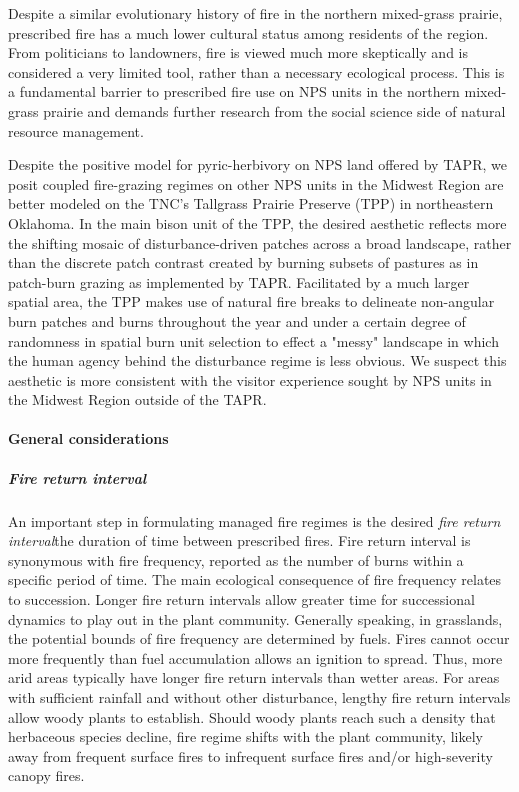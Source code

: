 Despite a similar evolutionary history of fire in the northern mixed-grass prairie, prescribed fire has a much lower cultural status among residents of the region. 
From politicians to landowners, fire is viewed much more skeptically and is considered a very limited tool, rather than a necessary ecological process. 
This is a fundamental barrier to prescribed fire use on NPS units in the northern mixed-grass prairie and demands further research from the social science side of natural resource management. 

Despite the positive model for pyric-herbivory on NPS land offered by TAPR, we posit coupled fire-grazing regimes on other NPS units in the Midwest Region are better modeled on the TNC's Tallgrass Prairie Preserve (TPP) in northeastern Oklahoma.
In the main bison unit of the TPP, the desired aesthetic reflects more the shifting mosaic of disturbance-driven patches across a broad landscape, rather than the discrete patch contrast created by burning subsets of pastures as in patch-burn grazing as implemented by TAPR. 
Facilitated by a much larger spatial area, the TPP makes use of natural fire breaks to delineate non-angular burn patches and burns throughout the year and under a certain degree of randomness in spatial burn unit selection to effect a "messy" landscape in which the human agency behind the disturbance regime is less obvious.
We suspect this aesthetic is more consistent with the visitor experience sought by NPS units in the Midwest Region outside of the TAPR.

\paragraph{General considerations}

\subparagraph{Fire return interval}

An important step in formulating managed fire regimes is the desired \emph{fire return interval}\textemdash the duration of time between prescribed fires. 
Fire return interval is synonymous with fire frequency, reported as the number of burns within a specific period of time. 
The main ecological consequence of fire frequency relates to succession. 
Longer fire return intervals allow greater time for successional dynamics to play out in the plant community. 
Generally speaking, in grasslands, the potential bounds of fire frequency are determined by fuels.
Fires cannot occur more frequently than fuel accumulation allows an ignition to spread. 
Thus, more arid areas typically have longer fire return intervals than wetter areas. 
For areas with sufficient rainfall and without other disturbance, lengthy fire return intervals allow woody plants to establish.
Should woody plants reach such a density that herbaceous species decline, fire regime shifts with the plant community, likely away from frequent surface fires to infrequent surface fires and/or high-severity canopy fires. 

